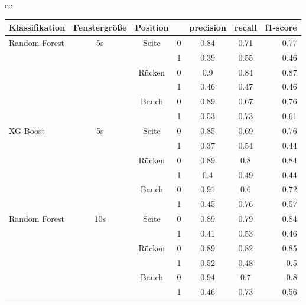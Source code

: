 \begin{table}
  \begin{tabular}{cc}
    \begin{minipage}{1\linewidth}
      \begin{center}
          \begin{tabular}{ | l | c | c | c | c | c | r | }
            \hline
            Klassifikation & Fenstergröße & Position & & precision & recall & f1-score \\ \hline
            Random Forest & 5s & Seite & 0 & 0.84 & 0.71 & 0.77 \\ 
                          &    &       & 1 & 0.39 & 0.55 & 0.46 \\ \hline
                          &    & Rücken& 0 & 0.9  & 0.84 & 0.87 \\ 
                          &    &       & 1 & 0.46 & 0.47 & 0.46 \\ \hline
                          &    & Bauch & 0 & 0.89 & 0.67 & 0.76 \\ 
                          &    &       & 1 & 0.53 & 0.73 & 0.61 \\ \hline
            \hline
            XG Boost & 5s & Seite & 0 & 0.85 & 0.69 & 0.76 \\
                     &    &       & 1 & 0.37 & 0.54 & 0.44 \\ \hline
                     &    & Rücken& 0 & 0.89 & 0.8  & 0.84 \\ 
                     &    &       & 1 & 0.4  & 0.49 & 0.44 \\ \hline
                     &    & Bauch & 0 & 0.91 & 0.6  & 0.72 \\ 
                     &    &       & 1 & 0.45 & 0.76 & 0.57 \\ \hline
            \hline
            Random Forest & 10s & Seite & 0 & 0.89 & 0.79 & 0.84 \\ 
                          &     &       & 1 & 0.41 & 0.53 & 0.46 \\ \hline
                          &     & Rücken& 0 & 0.89 & 0.82 & 0.85 \\
                          &     &       & 1 & 0.52 & 0.48 & 0.5  \\ \hline
                          &     & Bauch & 0 & 0.94 & 0.7  & 0.8  \\
                          &     &       & 1 & 0.46 & 0.73 & 0.56 \\ \hline

\end{tabular}
\end{center}
\end{minipage}
\end{tabular}
\end{table}
